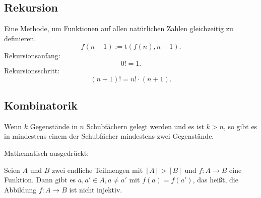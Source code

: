 \documentclass[a4paper,12pt]{article}
\numberwithin{equation}{section}
\begin{document}
\subsection{Rekursion}
Eine Methode, um Funktionen auf allen natürlichen Zahlen gleichzeitig zu definieren.
\[ 
f\left( n+1\right) :=\text{t}\left( f\left( n\right) ,n+1\right) 
.\] Rekursionsanfang:
\[ 
0!=1
.\] 
Rekursionsschritt:
\[ 
        \left( n+1\right) !=n!\cdot \left( n+1\right) 
.\] 

\subsection{Kombinatorik}
\begin{center}
        \glqq Wenn $k$ Gegenstände in $n$ Schubfächern gelegt werden und es ist $k>n$, so gibt es in mindestens einem der Schubfächer mindestens zwei Gegenstände.\grqq
\end{center}
Mathematisch ausgedrückt:
\begin{center}
        Seien $A$ und $B$ zwei endliche Teilmengen mit $\,|\, A\,|\, >\,|\, B\,|\, $ und $f:A\rightarrow B$ eine Funktion. Dann gibt es $a,a' \in A,a\neq a'$ mit $f\left( a\right) =f\left( a'\right) $, das heißt, die Abbildung $f:A\rightarrow B$ ist nicht injektiv.
\end{center}
\end{document}

